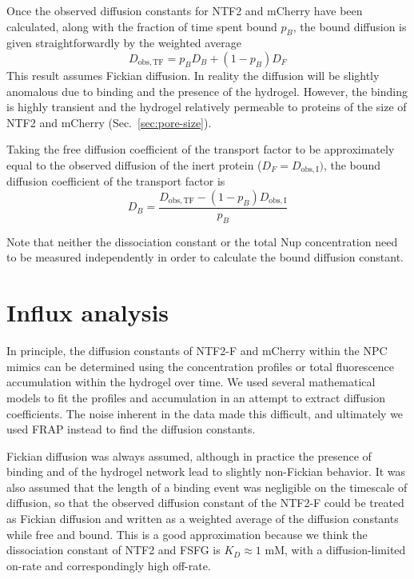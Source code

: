 Once the observed diffusion constants for NTF2 and mCherry have been calculated, along with the fraction of time spent bound $p_B$, the bound diffusion is given straightforwardly by the weighted average
\begin{equation}
D_\mathrm{obs, TF} = p_B D_B + (1-p_B) D_F
\label{eq:weighted-average}
\end{equation}
This result assumes Fickian diffusion.  In reality the diffusion will be slightly anomalous due to binding and the presence of the hydrogel.  However, the binding is highly transient and the hydrogel relatively permeable to proteins of the size of NTF2 and mCherry (Sec.~\ref{sec:pore-size}).

Taking the free diffusion coefficient of the transport factor to be approximately equal to the observed diffusion of the inert protein ($D_F = D_\mathrm{obs,I})$, the bound diffusion coefficient of the transport factor is
\begin{equation}
D_B = \frac{D_\mathrm{obs, TF}-(1-p_B) D_\mathrm{obs,I}}{p_B}
\label{eq:d-bound}
\end{equation}

Note that neither the dissociation constant or the total Nup concentration need to be measured independently in order to calculate the bound diffusion constant.

\section{Influx analysis}
In principle, the diffusion constants of NTF2-F and mCherry within the NPC mimics can be determined using the concentration profiles or total fluorescence accumulation within the hydrogel over time.  We used several mathematical models to fit the profiles and accumulation in an attempt to extract diffusion coefficients.  The noise inherent in the data made this difficult, and ultimately we used FRAP instead to find the diffusion constants.

Fickian diffusion was always assumed, although in practice the presence of binding and of the hydrogel network lead to slightly non-Fickian behavior.  It was also assumed that the length of a binding event was negligible on the timescale of diffusion, so that the observed diffusion constant of the NTF2-F could be treated as Fickian diffusion and written as a weighted average of the diffusion constants while free and bound.  This is a good approximation because we think the dissociation constant of NTF2 and FSFG is $K_D \approx 1$ mM, with a diffusion-limited on-rate and correspondingly high off-rate.
